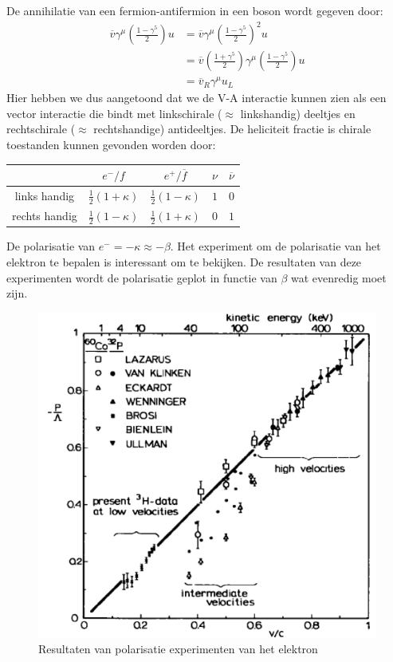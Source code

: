 \documentclass[../main.tex]{subfiles}
\begin{document}
De annihilatie van een fermion-antifermion in een boson wordt gegeven door:
\begin{equation}
    \begin{aligned}
        \label{eq:fermion_annihilatie}
        \overline v \gamma^\mu \left( \frac{1-\gamma^5}{2} \right) u &= \overline v \gamma^\mu \left( \frac{1-\gamma^5}{2} \right)^2 u\\
                                                                     &= \overline v \left( \frac{1+\gamma^5}{2} \right) \gamma^\mu \left( \frac{1-\gamma^5}{2} \right) u\\
                                                                     &= \overline v_R \gamma^\mu u_L
    \end{aligned}
\end{equation}
Hier hebben we dus aangetoond dat we de V-A interactie kunnen zien als een vector interactie die bindt met linkschirale ($\approx$ linkshandig) deeltjes en rechtschirale ($\approx$ rechtshandige) antideeltjes. De heliciteit fractie is chirale toestanden kunnen gevonden worden door:

\begin{table}[h]
    \centering
    \label{tab:chir_hel}
    \begin{tabular}{c|cccc}
                        & $e^-/f$                   & $e^+/\overline f$         & $\nu$ & $\overline \nu$   \\
        \hline
        links handig    & $\frac{1}{2}(1+\kappa)$   & $\frac{1}{2}(1-\kappa)$   & $1$   & $0$               \\
        rechts handig   & $\frac{1}{2}(1-\kappa)$   & $\frac{1}{2}(1+\kappa)$   & $0$   & $1$               
    \end{tabular}
\end{table}
De polarisatie van $e^- = -\kappa \approx -\beta$. Het experiment om de polarisatie van het elektron te bepalen is interessant om te bekijken. De resultaten van deze experimenten wordt de polarisatie geplot in functie van $\beta$ wat evenredig moet zijn. 

\begin{figure}[h]
    \centering
    \includegraphics[width=0.5\linewidth]{parity_violation/pol_elektron.png}
    \caption{Resultaten van polarisatie experimenten van het elektron}%
    \label{fig:parity_violation/pol_elektron}
\end{figure}
\end{document}
